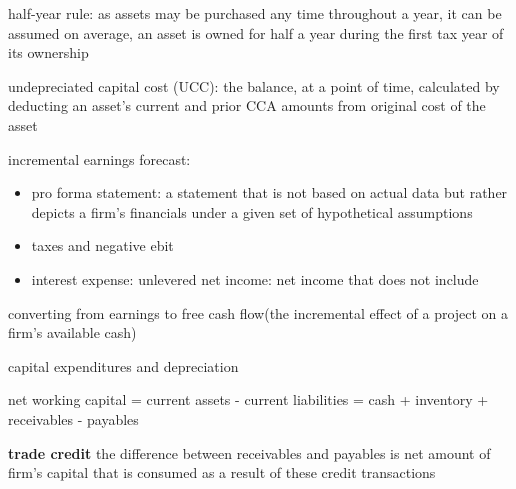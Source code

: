 \documentclass[10pt]{article}
\theoremstyle{break}
\begin{document}
half-year rule: as assets may be purchased any time throughout a year, it can be assumed on average, an asset is owned for half a year during the first tax year of its ownership

undepreciated capital cost (UCC): the balance, at a point of time, calculated by deducting an asset's current and prior CCA amounts from original cost of the asset

incremental earnings forecast: 
\begin{itemize}
    \item pro forma statement: a statement that is not based on actual data but rather depicts a firm's financials under a given set of hypothetical assumptions
    \item taxes and negative ebit 
    \item interest expense: unlevered net income: net income that does not include 
\end{itemize}

converting from earnings to free cash flow(the incremental effect of a project on a firm's available cash)

capital expenditures and depreciation

net working capital = current assets - current liabilities = cash + inventory + receivables - payables

\textbf{trade credit} the difference between receivables and payables is net amount of firm's capital that is consumed as a result of these credit transactions
\end{document}
